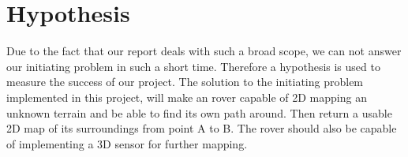 \section{Hypothesis}

Due to the fact that our report deals with such a broad scope, we can not answer our initiating problem in such a short time. Therefore a hypothesis is used to measure the success of our project.
The solution to the initiating problem implemented in this project, will make an rover capable of 2D mapping an unknown terrain and be able to find its own path around. Then return a usable 2D map of its surroundings from point A to B. The rover should also be capable of implementing a 3D sensor for further mapping.